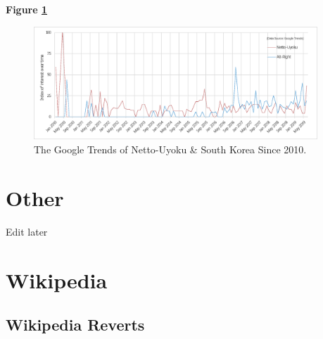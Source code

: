 \documentclass[10pt,british,A4paper,,openany]{memoir}
\begin{document}
\textbf{Figure \ref{fig:netto-altright-kor}}

\begin{figure}[!htb]
 \caption{\label{fig:netto-altright-kor} The Google Trends of Netto-Uyoku \& South Korea Since 2010.}
 \centering
 \includegraphics[width=0.95\textwidth,trim=4 4 4 4,clip]{images/netto-altright-kor.eps}
\end{figure}

\section{Other}\label{other}

Edit later

\section{Wikipedia}\label{wikipedia}

\subsection{Wikipedia Reverts}\label{wikipedia-reverts}
\end{document}
